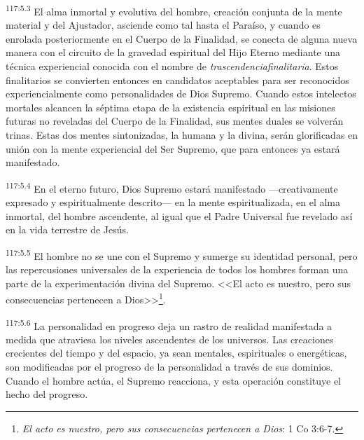 \par
\textsuperscript{117:5.3} El alma inmortal y evolutiva del hombre, creación conjunta de la mente material y del Ajustador, asciende como tal hasta el Paraíso, y cuando es enrolada posteriormente en el Cuerpo de la Finalidad, se conecta de alguna nueva manera con el circuito de la gravedad espiritual del Hijo Eterno mediante una técnica experiencial conocida con el nombre de \textit{trascendenciafinalitaria}. Estos finalitarios se convierten entonces en candidatos aceptables para ser reconocidos experiencialmente como personalidades de Dios Supremo. Cuando estos intelectos mortales alcancen la séptima etapa de la existencia espiritual en las misiones futuras no reveladas del Cuerpo de la Finalidad, sus mentes duales se volverán trinas. Estas dos mentes sintonizadas, la humana y la divina, serán glorificadas en unión con la mente experiencial del Ser Supremo, que para entonces ya estará manifestado.

\par
\textsuperscript{117:5.4} En el eterno futuro, Dios Supremo estará manifestado ---creativamente expresado y espiritualmente descrito--- en la mente espiritualizada, en el alma inmortal, del hombre ascendente, al igual que el Padre Universal fue revelado así en la vida terrestre de Jesús.

\par
\textsuperscript{117:5.5} El hombre no se une con el Supremo y sumerge su identidad personal, pero las repercusiones universales de la experiencia de todos los hombres forman una parte de la experimentación divina del Supremo. <<El acto es nuestro, pero sus consecuencias pertenecen a Dios>>\footnote{\textit{El acto es nuestro, pero sus consecuencias pertenecen a Dios}: 1 Co 3:6-7.}.

\par
\textsuperscript{117:5.6} La personalidad en progreso deja un rastro de realidad manifestada a medida que atraviesa los niveles ascendentes de los universos. Las creaciones crecientes del tiempo y del espacio, ya sean mentales, espirituales o energéticas, son modificadas por el progreso de la personalidad a través de sus dominios. Cuando el hombre actúa, el Supremo reacciona, y esta operación constituye el hecho del progreso.

